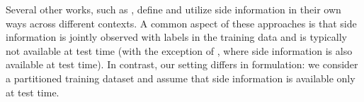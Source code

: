 Several other works, such as \cite{adel2023general, chen2012boosting, jonschkowski2015patterns, mollaysa2017regularising}, define and utilize side information in their own ways across different contexts. A common aspect of these approaches is that side information is jointly observed with labels in the training data and is typically not available at test time (with the exception of \cite{adel2023general}, where side information is also available at test time). In contrast, our setting differs in formulation: we consider a partitioned training dataset and assume that side information is available only at test time.








